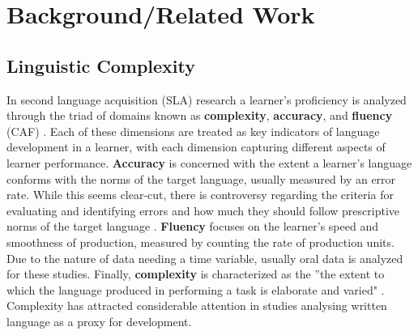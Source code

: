 \chapter{Background/Related Work}

\section{Linguistic Complexity}


In second language acquisition (SLA) research a learner's proficiency is analyzed through the triad of domains known
as \textbf{complexity}, \textbf{accuracy}, and \textbf{fluency} (CAF) \cite{Skehan1989,ellis2003}. Each of these
dimensions are treated as key indicators of language development in a learner, with each dimension capturing different
aspects of learner performance. \textbf{Accuracy} is concerned with the extent a learner's language conforms with
the norms of the target language, usually measured by an error rate. While this seems clear-cut, there is
controversy regarding the criteria for evaluating and identifying errors and how much they should follow
prescriptive norms of the target language \cite{housen2009}. \textbf{Fluency} focuses on the learner's
speed and smoothness of production, measured by counting the rate of production units. Due to the nature of data
needing a time variable, usually oral data is analyzed for these studies. Finally,
\textbf{complexity} is characterized as the ”the extent to which the language
produced in performing a task is elaborate
and varied" \cite{ellis2003}. Complexity has attracted considerable attention
in studies analysing written language as a proxy for development.

